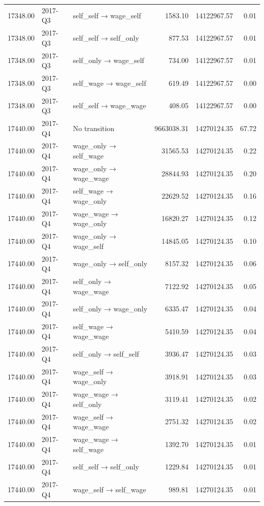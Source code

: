 \begin{table}[ht]
{\begin{tabular}{rllrrr}
  17348.00 & 2017-Q3 & self\_self → wage\_self & 1583.10 & 14122967.57 & 0.01 \\ 
  17348.00 & 2017-Q3 & self\_self → self\_only & 877.53 & 14122967.57 & 0.01 \\ 
  17348.00 & 2017-Q3 & self\_only → wage\_self & 734.00 & 14122967.57 & 0.01 \\ 
  17348.00 & 2017-Q3 & self\_wage → wage\_self & 619.49 & 14122967.57 & 0.00 \\ 
  17348.00 & 2017-Q3 & self\_self → wage\_wage & 408.05 & 14122967.57 & 0.00 \\ 
  17440.00 & 2017-Q4 & No transition & 9663038.31 & 14270124.35 & 67.72 \\ 
  17440.00 & 2017-Q4 & wage\_only → self\_wage & 31565.53 & 14270124.35 & 0.22 \\ 
  17440.00 & 2017-Q4 & wage\_only → wage\_wage & 28844.93 & 14270124.35 & 0.20 \\ 
  17440.00 & 2017-Q4 & self\_wage → wage\_only & 22629.52 & 14270124.35 & 0.16 \\ 
  17440.00 & 2017-Q4 & wage\_wage → wage\_only & 16820.27 & 14270124.35 & 0.12 \\ 
  17440.00 & 2017-Q4 & wage\_only → wage\_self & 14845.05 & 14270124.35 & 0.10 \\ 
  17440.00 & 2017-Q4 & wage\_only → self\_only & 8157.32 & 14270124.35 & 0.06 \\ 
  17440.00 & 2017-Q4 & self\_only → wage\_wage & 7122.92 & 14270124.35 & 0.05 \\ 
  17440.00 & 2017-Q4 & self\_only → wage\_only & 6335.47 & 14270124.35 & 0.04 \\ 
  17440.00 & 2017-Q4 & self\_wage → wage\_wage & 5410.59 & 14270124.35 & 0.04 \\ 
  17440.00 & 2017-Q4 & self\_only → self\_self & 3936.47 & 14270124.35 & 0.03 \\ 
  17440.00 & 2017-Q4 & wage\_self → wage\_only & 3918.91 & 14270124.35 & 0.03 \\ 
  17440.00 & 2017-Q4 & wage\_wage → self\_only & 3119.41 & 14270124.35 & 0.02 \\ 
  17440.00 & 2017-Q4 & wage\_self → wage\_wage & 2751.32 & 14270124.35 & 0.02 \\ 
  17440.00 & 2017-Q4 & wage\_wage → self\_wage & 1392.70 & 14270124.35 & 0.01 \\ 
  17440.00 & 2017-Q4 & self\_self → self\_only & 1229.84 & 14270124.35 & 0.01 \\ 
  17440.00 & 2017-Q4 & wage\_self → self\_wage & 989.81 & 14270124.35 & 0.01 \\ 

\end{tabular}}
\end{table}
